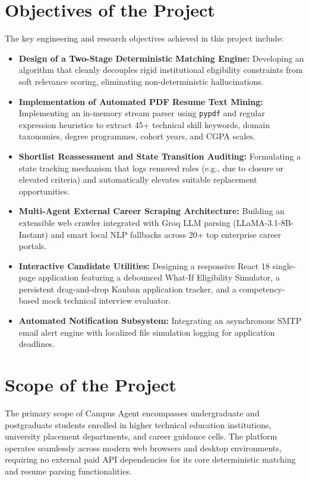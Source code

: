 \section{Objectives of the Project} \label{S1.4}
The key engineering and research objectives achieved in this project include:
\begin{itemize}
	\item \textbf{Design of a Two-Stage Deterministic Matching Engine:} Developing an algorithm that cleanly decouples rigid institutional eligibility constraints from soft relevance scoring, eliminating non-deterministic hallucinations.
	\item \textbf{Implementation of Automated PDF Resume Text Mining:} Implementing an in-memory stream parser using \texttt{pypdf} and regular expression heuristics to extract 45+ technical skill keywords, domain taxonomies, degree programmes, cohort years, and CGPA scales.
	\item \textbf{Shortlist Reassessment and State Transition Auditing:} Formulating a state tracking mechanism that logs removed roles (e.g., due to closure or elevated criteria) and automatically elevates suitable replacement opportunities.
	\item \textbf{Multi-Agent External Career Scraping Architecture:} Building an extensible web crawler integrated with Groq LLM parsing (LLaMA-3.1-8B-Instant) and smart local NLP fallbacks across 20+ top enterprise career portals.
	\item \textbf{Interactive Candidate Utilities:} Designing a responsive React 18 single-page application featuring a debounced What-If Eligibility Simulator, a persistent drag-and-drop Kanban application tracker, and a competency-based mock technical interview evaluator.
	\item \textbf{Automated Notification Subsystem:} Integrating an asynchronous SMTP email alert engine with localized file simulation logging for application deadlines.
\end{itemize}

\section{Scope of the Project} \label{S1.5}
The primary scope of Campus Agent encompasses undergraduate and postgraduate students enrolled in higher technical education institutions, university placement departments, and career guidance cells. The platform operates seamlessly across modern web browsers and desktop environments, requiring no external paid API dependencies for its core deterministic matching and resume parsing functionalities. 

